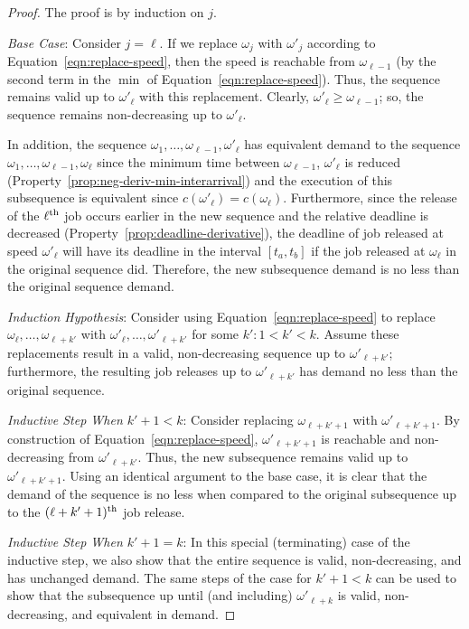 \begin{proof}
The proof is by induction on $j$.

\noindent \emph{Base Case}: Consider $j=\ell$.  If we replace $\omega_j$ with $\omega'_j$ according to Equation~\ref{eqn:replace-speed}, then the speed is reachable from $\omega_{\ell-1}$ (by the second term in the $\min$ of Equation~\ref{eqn:replace-speed}).  Thus, the sequence remains valid up to $\omega'_\ell$ with this replacement.  Clearly, $\omega'_\ell \geq \omega_{\ell-1}$; so, the sequence remains non-decreasing up to $\omega'_\ell$.  

In addition, the sequence $\omega_1, \ldots, \omega_{\ell-1}, \omega'_\ell$ has equivalent demand to the sequence $\omega_1, \ldots, \omega_{\ell-1}, \omega_\ell$ since the minimum time between $\omega_{\ell-1}$, $\omega'_\ell$ is reduced (Property~\ref{prop:neg-deriv-min-interarrival}) and the execution of this subsequence is equivalent since $c(\omega'_\ell) = c(\omega_\ell)$.  Furthermore, since the release of the $\ell^{\rm th}$ job occurs earlier in the new sequence and the relative deadline is decreased (Property~\ref{prop:deadline-derivative}), the deadline of job released at speed $\omega'_{\ell}$ will have its deadline in the interval $[t_a, t_b]$ if the job released at $\omega_\ell$ in the original sequence did.  Therefore, the new subsequence demand is no less than the original sequence demand.

\noindent \emph{Induction Hypothesis}:  Consider using Equation~\ref{eqn:replace-speed} to replace $\omega_\ell, \ldots,\omega_{\ell + k'}$ with $\omega'_\ell, \ldots,\omega'_{\ell + k'}$ for some $k': 1< k' < k$.  Assume these replacements result in a valid, non-decreasing sequence up to $\omega'_{\ell+k'}$; furthermore, the resulting job releases up to $\omega'_{\ell+k'}$ has demand no less than the original sequence.

\noindent \emph{Inductive Step When $k'+1 < k$}:  Consider replacing $\omega_{\ell +k'+1}$ with $\omega'_{\ell+ k'+1}$. By construction of Equation~\ref{eqn:replace-speed}, $\omega'_{\ell +k'+1}$ is reachable and non-decreasing from $\omega'_{\ell + k'}$.  Thus, the new subsequence remains valid up to $\omega'_{\ell+ k'+1}$.  Using an identical argument to the base case, it is clear that the demand of the sequence is no less when compared to the original subsequence up to the $(\ell+k'+1)^{\rm th}$ job release.

\noindent \emph{Inductive Step When $k'+1 = k$}:  In this special (terminating) case of the inductive step, we also show that the entire sequence is valid, non-decreasing, and has unchanged demand. The same steps of the case for $k' + 1 < k$ can be used to show that the subsequence up until (and including) $\omega'_{\ell +k}$ is valid, non-decreasing, and equivalent in demand.  


\end{proof}
